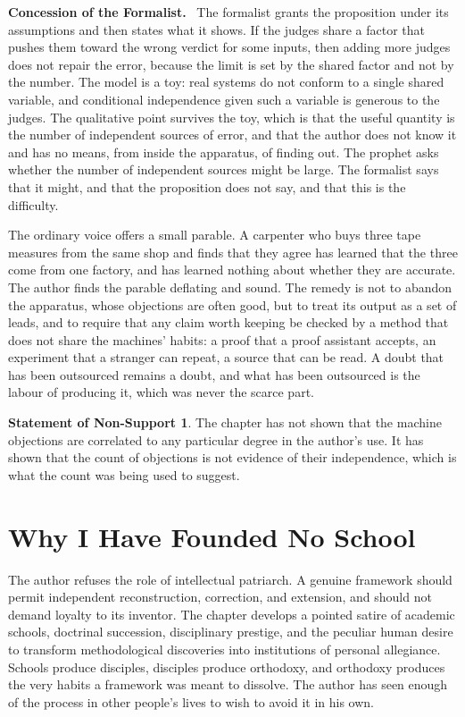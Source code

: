\documentclass[11pt,openany,twoside]{book}
\theoremstyle{plain}
\theoremstyle{definition}
\newtheorem{nonsupport}{Statement of Non-Support}
\theoremstyle{remark}
\newenvironment{concession}{\par\medskip\noindent\textbf{Concession of the Formalist.}\ }{\par\medskip}
\begin{document}
\begin{concession}
The formalist grants the proposition under its assumptions and then states what it shows. If the judges share a factor that pushes them toward the wrong verdict for some inputs, then adding more judges does not repair the error, because the limit is set by the shared factor and not by the number. The model is a toy: real systems do not conform to a single shared variable, and conditional independence given such a variable is generous to the judges. The qualitative point survives the toy, which is that the useful quantity is the number of independent sources of error, and that the author does not know it and has no means, from inside the apparatus, of finding out. The prophet asks whether the number of independent sources might be large. The formalist says that it might, and that the proposition does not say, and that this is the difficulty.
\end{concession}

The ordinary voice offers a small parable. A carpenter who buys three tape measures from the same shop and finds that they agree has learned that the three come from one factory, and has learned nothing about whether they are accurate. The author finds the parable deflating and sound. The remedy is not to abandon the apparatus, whose objections are often good, but to treat its output as a set of leads, and to require that any claim worth keeping be checked by a method that does not share the machines' habits: a proof that a proof assistant accepts, an experiment that a stranger can repeat, a source that can be read. A doubt that has been outsourced remains a doubt, and what has been outsourced is the labour of producing it, which was never the scarce part.

\begin{nonsupport}
The chapter has not shown that the machine objections are correlated to any particular degree in the author's use. It has shown that the count of objections is not evidence of their independence, which is what the count was being used to suggest.
\end{nonsupport}

\chapter{Why I Have Founded No School}

The author refuses the role of intellectual patriarch. A genuine framework should permit independent reconstruction, correction, and extension, and should not demand loyalty to its inventor. The chapter develops a pointed satire of academic schools, doctrinal succession, disciplinary prestige, and the peculiar human desire to transform methodological discoveries into institutions of personal allegiance. Schools produce disciples, disciples produce orthodoxy, and orthodoxy produces the very habits a framework was meant to dissolve. The author has seen enough of the process in other people's lives to wish to avoid it in his own.
\end{document}
